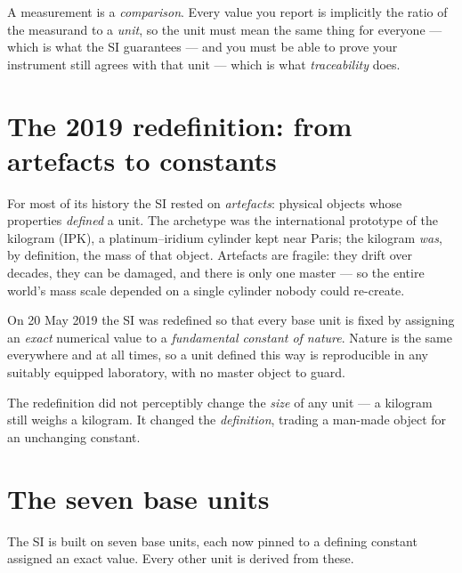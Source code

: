 \documentclass[11pt,a4paper,oneside]{book}
\begin{document}
\begin{keyidea}
A measurement is a \emph{comparison}. Every value you report is implicitly the
ratio of the measurand to a \emph{unit}, so the unit must mean the same thing for
everyone --- which is what the SI guarantees --- and you must be able to prove your
instrument still agrees with that unit --- which is what \emph{traceability} does.
\end{keyidea}

\section{The 2019 redefinition: from artefacts to constants}

For most of its history the SI rested on \emph{artefacts}: physical objects whose
properties \emph{defined} a unit. The archetype was the international prototype of
the kilogram (IPK), a platinum--iridium cylinder kept near Paris; the kilogram
\emph{was}, by definition, the mass of that object. Artefacts are fragile: they
drift over decades, they can be damaged, and there is only one master --- so the
entire world's mass scale depended on a single cylinder nobody could re-create.

On 20 May 2019 the SI was redefined so that every base unit is fixed by assigning
an \emph{exact} numerical value to a \emph{fundamental constant of nature}. Nature
is the same everywhere and at all times, so a unit defined this way is reproducible
in any suitably equipped laboratory, with no master object to guard.

\begin{note}
The redefinition did not perceptibly change the \emph{size} of any unit --- a
kilogram still weighs a kilogram. It changed the \emph{definition}, trading a
man-made object for an unchanging constant.
\end{note}

\section{The seven base units}\label{sec:baseunits}

The SI is built on seven base units, each now pinned to a defining constant
assigned an exact value. Every other unit is derived from these.
\end{document}
